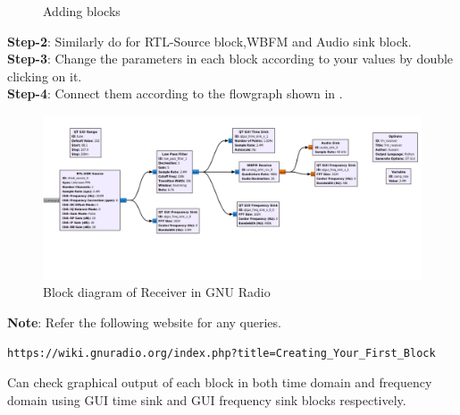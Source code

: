 \begin{enumerate}[label=\arabic*.,ref=\thesection.\theenumi]
\begin{figure}[H]
\caption{Adding blocks}
\label{fig:add blocks}
\end{figure}
\textbf{Step-2}:
Similarly do for RTL-Source block,WBFM and Audio sink block.
\\
\textbf{Step-3}:
Change the parameters in each block according to your values by double clicking on it.
\\
\textbf{Step-4}:
Connect them according to the flowgraph shown in .
\begin{figure}[H]
\centering
\includegraphics[width=\columnwidth]{fm/rx/figs/block_diagram.png}
\caption{Block diagram of Receiver in GNU Radio}
\label{fig:Rx_Block_diagram}
\end{figure}
\textbf{Note}:
Refer the following website for any queries.
\begin{lstlisting}
https://wiki.gnuradio.org/index.php?title=Creating_Your_First_Block
\end{lstlisting}

Can check graphical output of each block in both time domain and frequency domain using GUI time sink and GUI frequency sink blocks respectively.


\end{enumerate}
